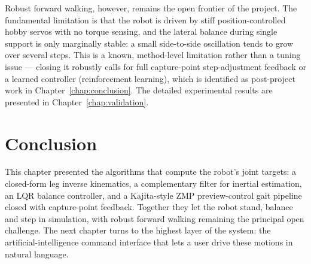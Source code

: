 Robust forward walking, however, remains the open frontier of the project.
The fundamental limitation is that the robot is driven by stiff
position-controlled hobby servos with no torque sensing, and the lateral
balance during single support is only marginally stable: a small
side-to-side oscillation tends to grow over several steps. This is a
known, method-level limitation rather than a tuning issue --- closing it
robustly calls for full capture-point step-adjustment feedback or a
learned controller (reinforcement learning), which is identified as
post-project work in Chapter~\ref{chap:conclusion}. The detailed
experimental results are presented in Chapter~\ref{chap:validation}.

\section{Conclusion}
This chapter presented the algorithms that compute the robot's joint
targets: a closed-form leg inverse kinematics, a complementary filter for
inertial estimation, an LQR balance controller, and a Kajita-style ZMP
preview-control gait pipeline closed with capture-point feedback. Together
they let the robot stand, balance and step in simulation, with robust
forward walking remaining the principal open challenge. The next chapter
turns to the highest layer of the system: the artificial-intelligence
command interface that lets a user drive these motions in natural
language.
